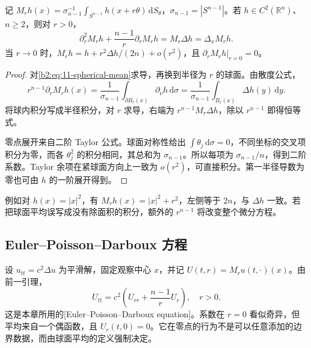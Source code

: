 \begin{lemma}[球面平均的微分恒等式]\label{b2:lem:11-spherical-identity}
记 \(M_rh(x)=\sigma_{n-1}^{-1}\int_{S^{n-1}}h(x+r\theta)\,\mathrm dS_\theta\)，\(\sigma_{n-1}=|S^{n-1}|\)。若 \(h\in C^2(\mathbb R^n)\)、\(n\geq2\)，则对 \(r>0\)，
\begin{equation}\label{b2:eq:11-epd-spatial}
 \partial_r^2M_rh+\dfrac{n-1}{r}\partial_rM_rh=M_r\Delta h=\Delta_xM_rh.
\end{equation}
当 \(r\to0\) 时，\(M_rh=h+r^2\Delta h/(2n)+o(r^2)\)，且 \(\partial_rM_rh|_{r=0}=0\)。
\end{lemma}
\begin{proof}
对\eqref{b2:eq:11-spherical-mean}求导，再换到半径为 \(r\) 的球面。由散度公式，
\[
 r^{n-1}\partial_rM_rh(x)
 =\dfrac1{\sigma_{n-1}}\int_{\partial B_r(x)}\partial_\nu h\,\mathrm{d}\sigma
 =\dfrac1{\sigma_{n-1}}\int_{B_r(x)}\Delta h(y)\,\mathrm{d}y.
\]
将球内积分写成半径积分，对 \(r\) 求导，右端为 \(r^{n-1}M_r\Delta h\)，除以 \(r^{n-1}\) 即得恒等式。

零点展开来自二阶 Taylor 公式。球面对称性给出 \(\int\theta_j\,\mathrm{d}\sigma=0\)，不同坐标的交叉项积分为零，而各 \(\theta_j^2\) 的积分相同，其总和为 \(\sigma_{n-1}\)。所以每项为 \(\sigma_{n-1}/n\)，得到二阶系数。Taylor 余项在紧球面方向上一致为 \(o(r^2)\)，可直接积分。第一半径导数为零也可由 \(h\) 的一阶展开得到。
\end{proof}

例如对 \(h(x)=|x|^2\)，有 \(M_rh(x)=|x|^2+r^2\)，左侧等于 \(2n\)，与 \(\Delta h\) 一致。若把球面平均误写成没有除面积的积分，额外的 \(r^{n-1}\) 将改变整个微分方程。

\subsection{Euler--Poisson--Darboux 方程}
\label{b2:subsec:110102}

设 \(u_{tt}=c^2\Delta u\) 为平滑解，固定观察中心 \(x\)，并记 \(U(t,r)=M_ru(t,\cdot)(x)\)。由前一引理，
\begin{equation}\label{b2:eq:11-epd}
 U_{tt}=c^2\left(U_{rr}+\dfrac{n-1}{r}U_r\right),\quad r>0.
\end{equation}
这是本章所用的[Euler--Poisson--Darboux equation]。系数在 \(r=0\) 看似奇异，但平均来自一个偶函数，且 \(U_r(t,0)=0\)。它在零点的行为不是可以任意添加的边界数据，而由球面平均的定义强制决定。

\ProseParagraphBreak

